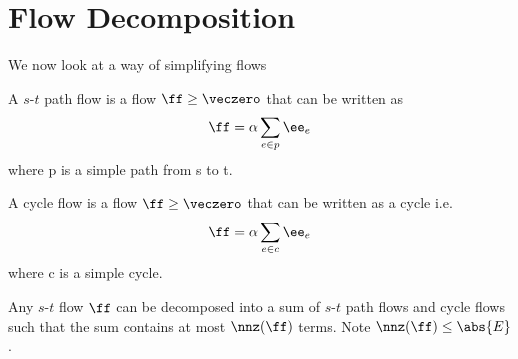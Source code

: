 \section{Flow Decomposition}
We now look at a way of simplifying flows
\begin{definition}
  A $s$-$t$ path flow is a flow \(\ff \geq \veczero\) that can be written as
  \begin{equation}\nonumber
      \ff = \alpha \sum_{e \in p} \ee_e
  \end{equation}
  where p is a simple path from s to t.
\end{definition}
\begin{definition}
  A cycle flow is a flow \(\ff \geq \veczero \) that can be written as a cycle i.e.
  \begin{equation}\nonumber
      \ff = \alpha \sum_{e \in c} \ee_e
  \end{equation}
  where c is a simple cycle.
\end{definition}
\begin{lemma}
 Any $s$-$t$ flow \(\ff\) can be decomposed into a sum of $s$-$t$ path
 flows and cycle flows such that the sum contains at most
 \(\nnz(\ff)\) terms. Note $\nnz(\ff) \leq \abs{E}$.
\end{lemma}
